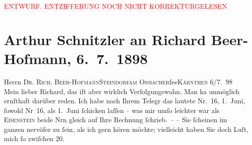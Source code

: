 
\begin{center}
            \textcolor{red}{ENTWURF. ENTZIFFERUNG NOCH NICHT KORREKTURGELESEN}
                      \end{center}
            
               \section[Arthur Schnitzler an Richard Beer-Hofmann, 6. 7. 1898]{ Arthur Schnitzler an Richard Beer-Hofmann, 6. 7. 1898}\nopagebreak{}\rehead{ }\begin{ledgroupsized}[t]{13cm}\normalsize\beginnumbering{} \toendnotes[C]{\smallbreak\pagebreak[2]} 
\toendnotes[C]{\smallbreak}\pstart{}{\pb}Herrn \textsc{Dr. Rich.
                     Beer-Hofmann}\pend{}\pstart{}\textsc{Steindorf}\pend{}\pstart{}\textsc{am }\textsc{Ossiacher}ſee\pend{}\pstart{}\textsc{Kärnthen}\pend{}{\bigskip}\pstart
           \raggedleft{}{\pb}6/7. 98\pend
           \pstart
           Mein lieber Richard, das iſt aber wirklich Verfolgungswahn. Man ka{\geminationn} unmöglich ernſthaft darüber reden. Ich habe nach Ihrem
               Telegr das lautete Nr. 16, 1. Juni, ſowohl  Nr 16, als 1. Juni{ }ſchicken laſſen – was mir umſo leichter war als \textsc{Eisenstein} beide Nrn gleich auf Ihre Rechnung ſchrieb. – \pend
           \pstart
           {\pb}– Sie ſcheinen im ganzen nervöſer zu ſein, als ich
               gern hören möchte; vielleicht haben Sie doch Luſt, mich ſo zwiſchen 20.

\end{ledgroupsized}
